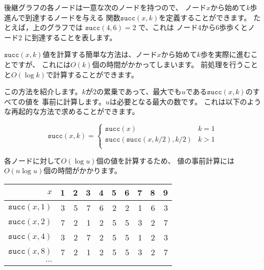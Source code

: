 後継グラフの各ノードは一意な次のノードを持つので、
ノード$x$から始めて$k$歩進んで到達するノードを与える
関数$\texttt{succ}(x,k)$を定義することができます。
たとえば，上のグラフでは $\texttt{succ}(4,6)=2$ で、これは
ノード4から6歩歩くとノード2 に到達することを表します。
\begin{center}
\end{center}

$\texttt{succ}(x,k)$値を計算する簡単な方法は、ノード$x$から始めて$k$歩を実際に進むことですが、
これには$O(k)$個の時間がかかってしまいます。
前処理を行うことと$O(\log k)$で計算することができます。

この方法を紹介します。$k$が2の累乗であって、最大でも$u$である$\texttt{succ}(x,k)$のすべての値を
事前に計算します。$u$は必要となる最大の数です。
これは以下のような再起的な方法で求めることができます。　

\begin{equation*}
    \texttt{succ}(x,k) = \begin{cases}
               \texttt{succ}(x)              & k = 1\\
               \texttt{succ}(\texttt{succ}(x,k/2),k/2)   & k > 1\\
           \end{cases}
\end{equation*}

各ノードに対して$O(\log u)$個の値を計算するため、
値の事前計算には$O(n \log u)$個の時間がかかります。

\begin{center}
\begin{tabular}{r|rrrrrrrrr}
$x$ & 1 & 2 & 3 & 4 & 5 & 6 & 7 & 8 & 9 \\
\hline
$\texttt{succ}(x,1)$ & 3 & 5 & 7 & 6 & 2 & 2 & 1 & 6 & 3 \\
$\texttt{succ}(x,2)$ & 7 & 2 & 1 & 2 & 5 & 5 & 3 & 2 & 7 \\
$\texttt{succ}(x,4)$ & 3 & 2 & 7 & 2 & 5 & 5 & 1 & 2 & 3 \\
$\texttt{succ}(x,8)$ & 7 & 2 & 1 & 2 & 5 & 5 & 3 & 2 & 7 \\
$\cdots$ \\
\end{tabular}
\end{center}

